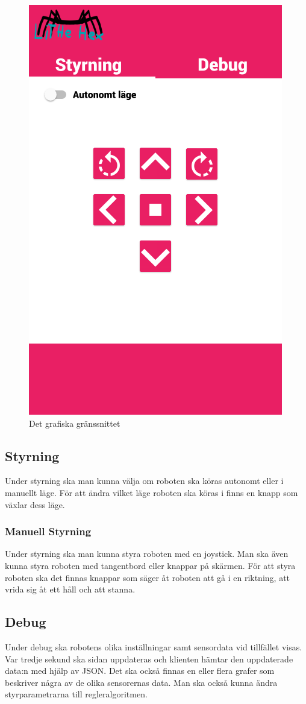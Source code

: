 \documentclass[a4paper,titlepage,12pt]{article}
\begin{document}
	\begin{figure}[h]
		\centering
		\includegraphics[width=0.5\linewidth]{images/gui-index.png}
		\caption{Det grafiska gränssnittet\label{fig:gui-overview}}
	\end{figure}

    \subsection{Styrning}
    Under styrning ska man kunna välja om roboten ska köras autonomt eller i manuellt läge.
    För att ändra vilket läge roboten ska köras i finns en knapp som växlar dess läge.
    
    \subsubsection{Manuell Styrning}
    Under styrning ska man kunna styra roboten med en joystick. Man ska även
    kunna styra roboten med tangentbord eller knappar på skärmen. För att styra
    roboten ska det finnas knappar som säger åt roboten att gå i en riktning,
    att vrida sig åt ett håll och att stanna.

    \subsection{Debug}
	Under debug ska robotens olika inställningar samt sensordata vid tillfället
    visas. Var tredje sekund ska sidan uppdateras och klienten hämtar den
    uppdaterade data:n med hjälp av JSON. Det ska
    också finnas en eller flera grafer som beskriver några av de olika sensorernas data.
    Man ska också kunna ändra styrparametrarna till regleralgoritmen.
\end{document}

